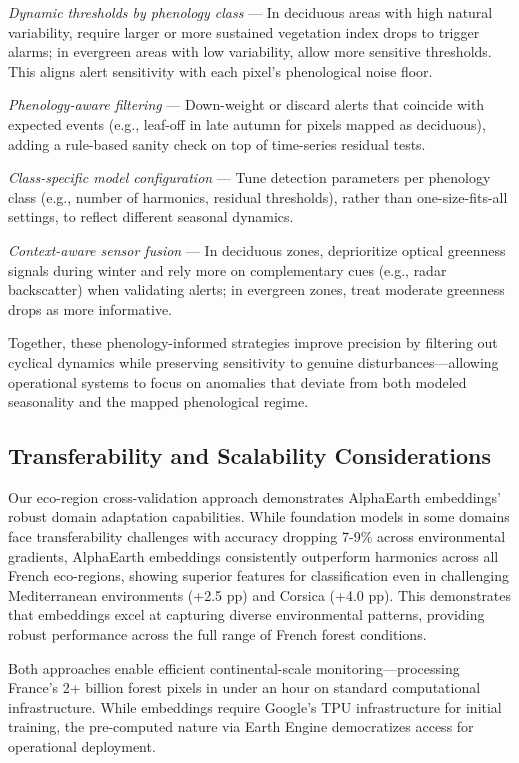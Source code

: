 \documentclass[utf8]{FrontiersinHarvard}
\begin{document}
\textit{Dynamic thresholds by phenology class} — In deciduous areas with high natural variability, require larger or more sustained vegetation index drops to trigger alarms; in evergreen areas with low variability, allow more sensitive thresholds. This aligns alert sensitivity with each pixel’s phenological noise floor.

\textit{Phenology-aware filtering} — Down-weight or discard alerts that coincide with expected events (e.g., leaf-off in late autumn for pixels mapped as deciduous), adding a rule-based sanity check on top of time-series residual tests.

\textit{Class-specific model configuration} — Tune detection parameters per phenology class (e.g., number of harmonics, residual thresholds), rather than one-size-fits-all settings, to reflect different seasonal dynamics.

\textit{Context-aware sensor fusion} — In deciduous zones, deprioritize optical greenness signals during winter and rely more on complementary cues (e.g., radar backscatter) when validating alerts; in evergreen zones, treat moderate greenness drops as more informative.

Together, these phenology-informed strategies improve precision by filtering out cyclical dynamics while preserving sensitivity to genuine disturbances—allowing operational systems to focus on anomalies that deviate from both modeled seasonality and the mapped phenological regime.

\subsection{Transferability and Scalability Considerations}

Our eco-region cross-validation approach demonstrates AlphaEarth embeddings' robust domain adaptation capabilities. While foundation models in some domains face transferability challenges with accuracy dropping 7-9\% across environmental gradients, AlphaEarth embeddings consistently outperform harmonics across all French eco-regions, showing superior features for classification even in challenging Mediterranean environments (+2.5 pp) and Corsica (+4.0 pp). This demonstrates that embeddings excel at capturing diverse environmental patterns, providing robust performance across the full range of French forest conditions.

Both approaches enable efficient continental-scale monitoring—processing France's 2+ billion forest pixels in under an hour on standard computational infrastructure. While embeddings require Google's TPU infrastructure for initial training, the pre-computed nature via Earth Engine democratizes access for operational deployment.
\end{document}
